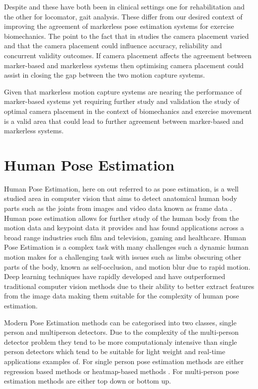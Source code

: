 Despite \citet{outerleys2025clinical} and \citet{unger2025differentiable} these have both been in clinical settings one for rehabilitation and the other for locomator, gait analysis. These differ from our desired context of improving the agreement of markerless pose estimation systems for exercise biomechanics.
The point to the fact that in studies the camera placement varied and that the camera placement could influence accuracy, reliability and concurrent validity outcomes. If camera placement affects the agreement between marker-based and markerless systems then optimising camera placement could assist in closing the gap between the two motion capture systems.

Given that markerless motion capture systems are nearing the performance of marker-based systems yet requiring further study and validation the study of optimal camera placement in the context of biomechanics and exercise movement is a valid area that could lead to further agreement between marker-based and markerless systems.

\section{Human Pose Estimation}

Human Pose Estimation, here on out referred to as pose estimation, is a well studied area in computer vision that aims to detect anatomical human body parts such as the joints from images and video data known as frame data \cite{zheng2023deep}.
Human pose estimation allows for further study of the human body from the motion data and keypoint data it provides and has found applications across a broad range industries such film and television, gaming and healthcare.
Human Pose Estimation is a complex task with many challenges such a dynamic human motion makes for a challenging task with issues such as limbs obscuring other parts of the body, known as self-occlusion, and motion blur due to rapid motion. Deep learning techniques have rapidly developed and have outperformed traditional computer vision methods due to their ability to better extract features from the image data making them suitable for the complexity of human pose estimation\cite{dang2019deep}.

Modern Pose Estimation methods can be categorised into two classes, single person and multiperson detectors. Due to the complexity of the multi-person detector problem they tend to be more computationaly intensive than single person detectors which tend to be suitable for light weight and real-time applications examples of.
For single person pose estimation methods are either regression based methods or heatmap-based methods \cite{dubey2023comprehensive}.
For multi-person pose estimation methods are either top down or bottom up.


